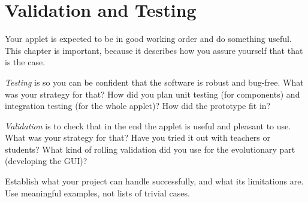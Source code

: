 
\chapter{Validation and Testing}
\label{cha:validation}

Your applet is expected to be in good working order and do something
useful. This chapter is important, because it describes how you
assure yourself that that is the case.

\emph{Testing} is so you can be confident that the software is
robust and bug-free. What was your strategy for that? How did you
plan unit testing (for components) and integration testing (for the
whole applet)? How did the prototype fit in?

\emph{Validation} is to check that in the end the applet is useful
and pleasant to use. What was your strategy for that? Have you tried
it out with teachers or students? What kind of rolling validation
did you use for the evolutionary part (developing the GUI)?

Establish what your project can handle successfully, and what its
limitations are. Use meaningful examples, not lists of trivial
cases.
